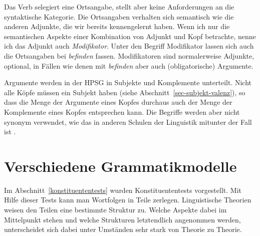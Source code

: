 Das Verb selegiert eine Ortsangabe, stellt aber keine Anforderungen an die syntaktische
Kategorie. Die Ortsangaben verhalten sich semantisch wie die anderen Adjunkte, die wir bereits
kennengelernt haben. Wenn ich nur die semantischen Aspekte einer Kombination von Adjunkt und Kopf
betrachte, nenne ich das Adjunkt auch \emph{Modifikator}. Unter den Begriff Modifikator lassen sich
auch die Ortsangaben bei \emph{befinden} fassen.
Modifikatoren sind normalerweise Adjunkte, \dash optional, in Fällen wie denen mit \emph{befinden} aber auch
(obligatorische) Argumente.

Argumente werden in der HPSG in Subjekte und Komplemente
unterteilt. Nicht alle Köpfe müssen ein Subjekt haben (siehe Abschnitt~\ref{sec-subjekt-valenz}),
so dass die Menge der Argumente eines Kopfes durchaus auch der Menge der Komplemente eines Kopfes entsprechen
kann. Die Begriffe werden aber nicht synonym verwendet, wie das in anderen Schulen
der Linguistik mitunter der Fall ist \citep[siehe z.\,B.][65]{Heringer96a-u}.
{}



\section{Verschiedene Grammatikmodelle}
\label{sec-grammatikmodelle}

Im Abschnitt~\ref{konstituententests} wurden Konstituententests vorgestellt. Mit Hilfe dieser Tests kann
man Wortfolgen in Teile zerlegen. Linguistische Theorien weisen den Teilen eine bestimmte
Struktur zu. Welche Aspekte dabei im Mittelpunkt stehen und welche Strukturen letztendlich
angenommen werden, unterscheidet sich dabei unter Umständen sehr stark von Theorie zu Theorie.

